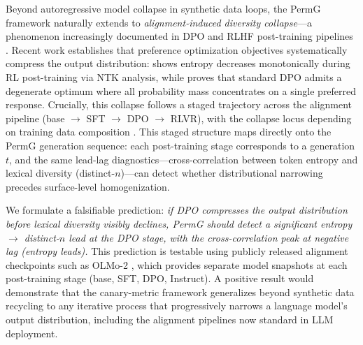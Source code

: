 
Beyond autoregressive model collapse in synthetic data loops, the PermG framework
naturally extends to \emph{alignment-induced diversity collapse}---a phenomenon
increasingly documented in DPO and RLHF post-training pipelines
\citep{kirk2024understanding, karouzos2026where, guo2025diverse}.
Recent work establishes that preference optimization objectives systematically
compress the output distribution: \citet{tomihari2026learning} shows entropy
decreases monotonically during RL post-training via NTK analysis, while
\citet{guo2025diverse} proves that standard DPO admits a degenerate optimum
where all probability mass concentrates on a single preferred response.
Crucially, this collapse follows a staged trajectory across the alignment
pipeline (base $\to$ SFT $\to$ DPO $\to$ RLVR), with the collapse locus
depending on training data composition \citep{karouzos2026where}.
This staged structure maps directly onto the PermG generation sequence:
each post-training stage corresponds to a generation $t$, and the same
lead-lag diagnostics---cross-correlation between token entropy and lexical
diversity (distinct-$n$)---can detect whether distributional narrowing
precedes surface-level homogenization.

We formulate a falsifiable prediction: \emph{if DPO compresses the output
distribution before lexical diversity visibly declines, PermG should detect
a significant entropy $\to$ distinct-$n$ lead at the DPO stage, with the
cross-correlation peak at negative lag (entropy leads).}
This prediction is testable using publicly released alignment checkpoints
such as OLMo-2 \citep{olmo2024olmo2}, which provides separate model snapshots
at each post-training stage (base, SFT, DPO, Instruct).
A positive result would demonstrate that the canary-metric framework
generalizes beyond synthetic data recycling to any iterative process that
progressively narrows a language model's output distribution, including
the alignment pipelines now standard in LLM deployment.

